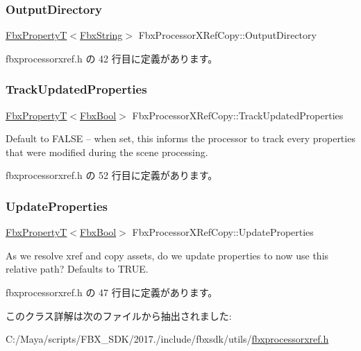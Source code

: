 \subsubsection{\texorpdfstring{Output\+Directory}{OutputDirectory}}
{\footnotesize\ttfamily \hyperlink{class_fbx_property_t}{Fbx\+PropertyT}$<$\hyperlink{class_fbx_string}{Fbx\+String}$>$ Fbx\+Processor\+X\+Ref\+Copy\+::\+Output\+Directory}



 fbxprocessorxref.\+h の 42 行目に定義があります。

\mbox{\label{class_fbx_processor_x_ref_copy_a0b9debffb0e6257ae9cbeec846ca72d0}} 
\subsubsection{\texorpdfstring{Track\+Updated\+Properties}{TrackUpdatedProperties}}
{\footnotesize\ttfamily \hyperlink{class_fbx_property_t}{Fbx\+PropertyT}$<$\hyperlink{fbxtypes_8h_a92e0562b2fe33e76a242f498b362262e}{Fbx\+Bool}$>$ Fbx\+Processor\+X\+Ref\+Copy\+::\+Track\+Updated\+Properties}

Default to F\+A\+L\+SE -- when set, this informs the processor to track every properties that were modified during the scene processing. 

 fbxprocessorxref.\+h の 52 行目に定義があります。

\mbox{\label{class_fbx_processor_x_ref_copy_a3e375b4793e369ff82265b61d56ebb91}} 
\subsubsection{\texorpdfstring{Update\+Properties}{UpdateProperties}}
{\footnotesize\ttfamily \hyperlink{class_fbx_property_t}{Fbx\+PropertyT}$<$\hyperlink{fbxtypes_8h_a92e0562b2fe33e76a242f498b362262e}{Fbx\+Bool}$>$ Fbx\+Processor\+X\+Ref\+Copy\+::\+Update\+Properties}

As we resolve xref and copy assets, do we update properties to now use this relative path? Defaults to T\+R\+UE. 

 fbxprocessorxref.\+h の 47 行目に定義があります。



このクラス詳解は次のファイルから抽出されました\+:\begin{DoxyCompactItemize}
\item 
C\+:/\+Maya/scripts/\+F\+B\+X\+\_\+\+S\+D\+K/2017./include/fbxsdk/utils/\hyperlink{fbxprocessorxref_8h}{fbxprocessorxref.\+h}\end{DoxyCompactItemize}
